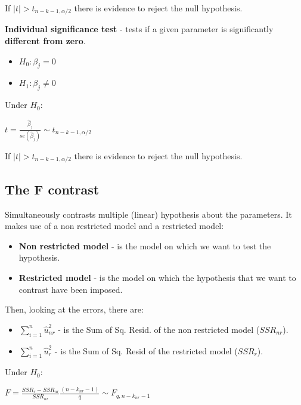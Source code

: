 \documentclass[10pt, a4paper, landscape]{extarticle}
\begin{document}
\begin{multicols}{3}
If $\mid t \mid > t_{n-k-1, \alpha/2}$ there is evidence to reject the null hypothesis.

\textbf{Individual significance test} - tests if a given parameter is significantly \textbf{different from zero}.

\begin{itemize}[leftmargin=*]
\item $H_0: \beta_j = 0$
\item $H_1: \beta_j \neq 0$
\end{itemize}

Under $H_0$:

\begin{center}
$t = \frac{\hat{\beta}_j}{se(\hat{\beta}_j)} \sim t_{n-k-1, \alpha/2}$
\end{center}

If $\mid t \mid > t_{n-k-1, \alpha/2}$ there is evidence to reject the null hypothesis.

\subsection*{The F contrast}

Simultaneously contrasts multiple (linear) hypothesis about the parameters. It makes use of a non restricted model and a restricted model:

\begin{itemize}[leftmargin=*]
\item \textbf{Non restricted model} - is the model on which we want to test the hypothesis.
\item \textbf{Restricted model} - is the model on which the hypothesis that we want to contrast have been imposed.
\end{itemize}

Then, looking at the errors, there are:

\begin{itemize}[leftmargin=*]
\item \textbf{$\sum_{i=1}^n \hat{u}_{nr}^2$} - is the Sum of Sq. Resid. of the non restricted model ($SSR_{nr}$).
\item \textbf{$\sum_{i=1}^n \hat{u}_r^2$} - is the Sum of Sq. Resid of the restricted model ($SSR_r$).
\end{itemize}

Under $H_0$:

\begin{center}
$F = \frac{SSR_r - SSR_{nr}}{SSR_{nr}} \frac{(n-k_{nr}-1)}{q} \sim F_{q, n-k_{nr}-1}$
\end{center}


\end{multicols}
\end{document}
